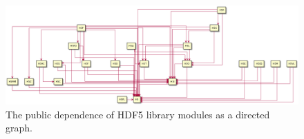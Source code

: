 
\begin{landscape}
\begin{figure}
\centering
\includegraphics[scale=0.4,angle=90]{images/packackages-public-dependence.png}
\caption{The public dependence of HDF5 library modules as a directed graph.\label{fig:pub-module-dep}}
\end{figure}
\end{landscape}









